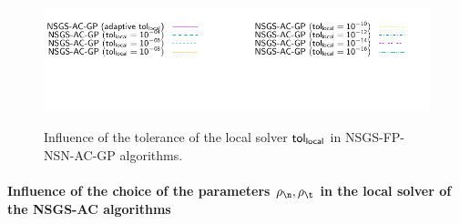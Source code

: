 \documentclass[a4paper]{article}
\begin{document}
\begin{figure}
{\includegraphics[height=\legendheight]{../figure/NSGS/LocalTol/1.0e-08/50/time/profile-Chain_legend.pdf}}  
\caption{Influence of the tolerance of the local solver $\sf tol_{local}$ in {\sf NSGS-FP-NSN-AC-GP} algorithms.}
\label{fig:NSGS/LocalTol}
\end{figure}


\paragraph{Influence of the choice of the parameters $\rho_\n, \rho_\t$ in the local solver of the {\sf NSGS-AC} algorithms}
\end{document}
